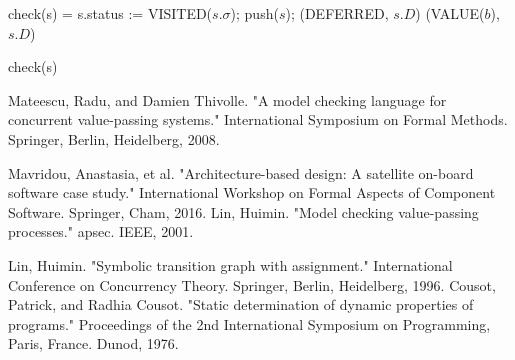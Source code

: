 \documentclass[runningheads,a4paper]{llncs}
\begin{document}
\begin{algorithm} 
	\begin{algorithmic}[1]
		\State check(s) =
		\State s.status := VISITED($s.\sigma$); push($s$); \Return (DEFERRED, $s.D$)
		\EndCase
		\Return (VALUE($b$), $s.D$)
		\EndCase
		\EndSwitch
		
	\end{algorithmic} 
	\caption{check(s)}
	\label{alg:algorithm2}
\end{algorithm}





\begin{thebibliography}{4}
	
	Mateescu, Radu, and Damien Thivolle. "A model checking language for concurrent value-passing systems." International Symposium on Formal Methods. Springer, Berlin, Heidelberg, 2008.
	
	 Mavridou, Anastasia, et al. "Architecture-based design: A satellite on-board software case study." International Workshop on Formal Aspects of Component Software. Springer, Cham, 2016.
	 Lin, Huimin. "Model checking value-passing processes." apsec. IEEE, 2001.

	 Lin, Huimin. "Symbolic transition graph with assignment." International Conference on Concurrency Theory. Springer, Berlin, Heidelberg, 1996.
	Cousot, Patrick, and Radhia Cousot. "Static determination of dynamic properties of programs." Proceedings of the 2nd International Symposium on Programming, Paris, France. Dunod, 1976.
	
\end{thebibliography}
\end{document}
